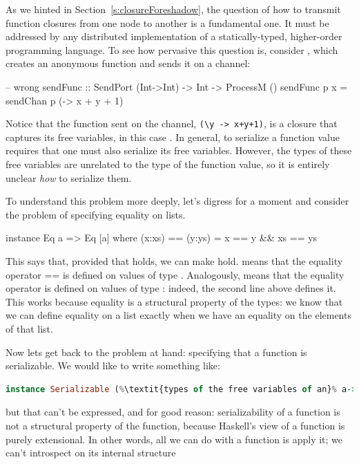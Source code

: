 \documentclass[preprint]{sigplanconf}
\begin{document}
\noindent
As we hinted in Section~\ref{s:closureForeshadow}, 
the question of how to transmit function closures from one node to another is a fundamental one.  
It must be addressed by any distributed implementation of a statically-typed, 
higher-order programming language.  
To see how pervasive this question is, consider , which creates an anonymous function and sends it on a channel:
\begin{code}
-- wrong
sendFunc :: SendPort (Int->Int) -> Int -> ProcessM ()
sendFunc p x = sendChan p (\y -> x + y + 1)
\end{code}
Notice that the function sent on the channel, \lstinline!(\y -> x+y+1)!,
is a closure that captures its free variables,
in this case . 
In general, to serialize a function value requires that one must also serialize its free variables.
However, the types of
these free variables are unrelated to the type of the function
value, so it is entirely unclear \emph{how} to serialize them.

To understand this problem more deeply, let's digress for a moment and consider the problem of specifying equality on lists.
\begin{code}
  instance Eq a => Eq [a] where
  	(x:xs) == (y:ys) = x == y && xs == ys
\end{code}
This says that, provided that  holds, we can make  hold.
 means that the equality operator \textsf{=\!=} is defined on values of type .  Analogously,  means that the equality operator is defined on values of type \textt{[a]}: indeed, the second line above defines it.
This works because equality is a structural property of the types: we know that we can define equality on a list exactly when we have an equality on the elements of that list.

Now lets get back to the problem at hand: specifying that a function is serializable.
We would like to write something like:
\begin{lstlisting}[language=Haskell,
			escapechar={\%},
			stringstyle=\ttfamily]
  instance Serializable (%\textit{types of the free variables of an}% a->b) => Serializable (a->b) where ...
\end{lstlisting}
but that can't be expressed, and for good reason:  serializability of a function is not a structural property of the function, because Haskell's view of a function is purely extensional.  
In other words, all we can do with a function is apply it; we can't introspect on its internal structure
\end{document}
